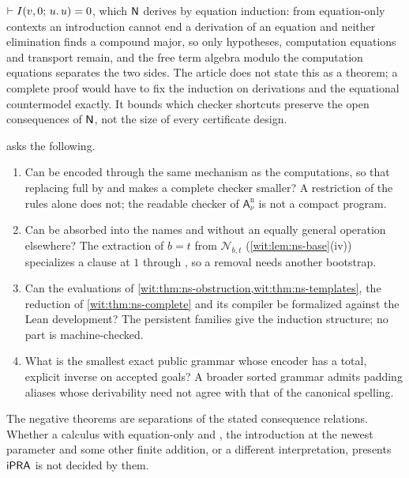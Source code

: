 \begin{question}
\begin{enumerate}[label=\textup{(\roman*)}]
 $\vdash I(v,0;\,u.\,u)=0$, which $\mathsf{N}$ derives by equation induction:
 from equation-only contexts an introduction cannot end a derivation of an
 equation and neither elimination finds a compound major, so only
 hypotheses, computation equations and transport remain, and the free term
 algebra modulo the computation equations separates the two sides.  The
 article does not state this as a theorem; a complete proof would have to
 fix the induction on derivations and the equational countermodel exactly.
 It bounds which checker shortcuts preserve the open consequences of $\mathsf{N}$,
 not the size of every certificate design.
\end{enumerate}
\end{question}

\begin{question}
\label{wit:q:ns}
 asks the following.
\begin{enumerate}[label=\textup{(\roman*)}]
\item Can  be encoded through the same mechanism as the
 computations, so that replacing full  by
  and  makes a complete checker smaller?
 A restriction of the rules alone does not; the readable checker of
 $\mathsf{A}^{\mathrm n}_{\nu}$ is not a compact program.
\item Can  be absorbed into the names and 
 without an equally general operation elsewhere?  The extraction of
 $b=t$ from $\mathcal N_{b,t}$ (\cref{wit:lem:ns-base}(iv)) specializes a
 clause at $1$ through , so a removal needs another
 bootstrap.
\item Can the evaluations of \cref{wit:thm:ns-obstruction,wit:thm:ns-templates},
 the reduction of \cref{wit:thm:ns-complete} and its compiler be formalized
 against the Lean development?  The persistent families give the induction
 structure; no part is machine-checked.
\item What is the smallest exact public grammar whose encoder has a total,
 explicit inverse on accepted goals?  A broader sorted grammar admits
 padding aliases whose derivability need not agree with that of the
 canonical spelling.
\end{enumerate}
The negative theorems are separations of the stated consequence relations.
Whether a calculus with equation-only  and ,
the introduction at the newest parameter and some other finite addition, or
a different interpretation, presents $\mathsf{iPRA}$ is not decided by them.
\end{question}


